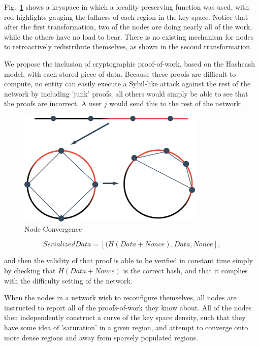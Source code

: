 \documentclass[10pt]{IEEEtran}
\begin{document}
\par Fig.~\ref{fig_kSpaceUneven} shows a keyspace in which a locality preserving function was used, with red highlights gauging the fullness of each region in the key space. Notice that after the first transformation, two of the nodes are doing nearly all of the work, while the others have no load to bear. There is no existing mechanism for nodes to retroactively redistribute themselves, as shown in the second transformation.


\par We propose the inclusion of cryptographic proof-of-work, based on the Hashcash~\cite{Back:2002vq} model, with each stored piece of data. Because these proofs are difficult to compute, no entity can easily execute a Sybil-like attack against the rest of the network by including 'junk' proofs; all others would simply be able to see that the proofs are incorrect. A user $j$ would send this to the rest of the network:

\begin{figure}[!t]
\centering
\includegraphics[width=3.5in]{unevenDistro}
\caption{Node Convergence}
\label{fig_kSpaceUneven}
\end{figure}

\begin{equation} \label{eq:proof}
SerializedData = [(H(Data + Nonce), Data, Nonce],
\end{equation}

and then the validity of that proof is able to be verified in constant time simply by checking that $H(Data + Nonce)$ is the correct hash, and that it complies with the difficulty setting of the network.


\par When the nodes in a network wish to reconfigure themselves, all nodes are instructed to report all of the proofs-of-work they know about. All of the nodes then independently construct a curve of the key space density, such that they have some idea of 'saturation' in a given region, and attempt to converge onto more dense regions and away from sparsely populated regions.
\end{document}
